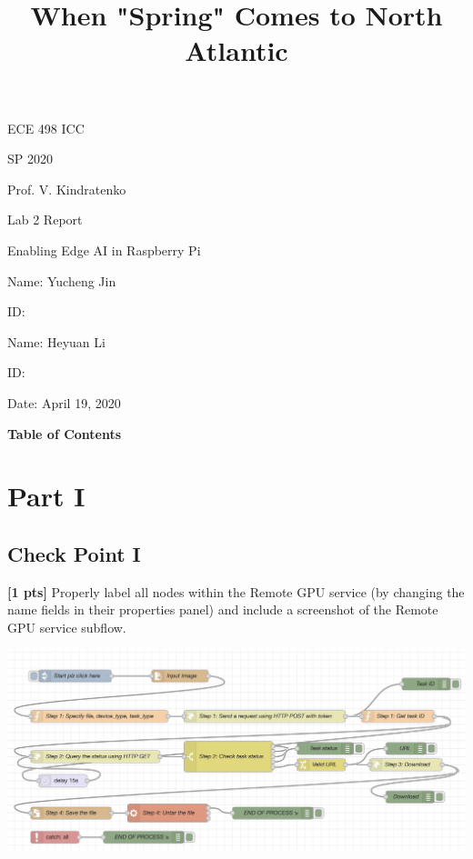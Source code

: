 \documentclass{mcmthesis}
\title{When "Spring" Comes to North Atlantic}
\begin{document}
\begin{center}


\item
\item

\huge{ECE 498 ICC} 

\huge{SP 2020}



\Large{Prof. V. Kindratenko}

\end{center}

\begin{center}

\item
\item
\item
\Huge{Lab 2 Report}



\Huge{Enabling Edge AI in Raspberry Pi}

\end{center}

\begin{center}

\item
\item
\item
\Large{Name: Yucheng Jin}
\item
\Large{ID: }
\item
\Large{Name: \text{ } Heyuan Li}
\item
\Large{ID: }
\item
\Large{Date: \text{ } April 19, 2020}


\end{center}

\pagebreak
\renewcommand{\contentsname}{\tiny{}}
\begin{center}
\textbf{\Large{Table of Contents}}
\end{center}
\tableofcontents
\pagebreak

\section{Part I}
\subsection{Check Point I}
\textbf{[1 pts]} Properly label all nodes within the Remote GPU service (by changing the name fields in their properties panel) and include a screenshot of the Remote GPU service subflow.
\begin{center}
\includegraphics[width=15cm]{part1.png}
\end{center}
\end{document}
